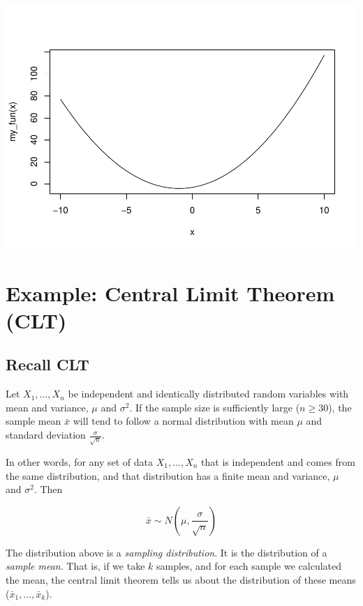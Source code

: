 \documentclass[
]{book}
\begin{document}
\includegraphics{_main_files/figure-latex/unnamed-chunk-289-1.pdf}

\hypertarget{example-central-limit-theorem-clt}{%
\section{Example: Central Limit Theorem (CLT)}\label{example-central-limit-theorem-clt}}

\hypertarget{recall-clt}{%
\subsection{Recall CLT}\label{recall-clt}}

Let \(X_1, ..., X_n\) be independent and identically distributed random variables with mean and variance, \(\mu\) and \(\sigma^2\). If the sample size is sufficiently large (\(n \geq 30\)), the sample mean \(\bar{x}\) will tend to follow a normal distribution with mean \(\mu\) and standard deviation \(\frac{\sigma}{\sqrt{n}}\).

In other words, for any set of data \(X_1, ..., X_n\) that is independent and comes from the same distribution, and that distribution has a finite mean and variance, \(\mu\) and \(\sigma^2\). Then

\[\bar{x} \sim N \left ( \mu, \frac{\sigma}{\sqrt{n}} \right ) \]

The distribution above is a \emph{sampling distribution}. It is the distribution of a \emph{sample mean}. That is, if we take \(k\) samples, and for each sample we calculated the mean, the central limit theorem tells us about the distribution of these means (\(\bar{x}_1, \dots, \bar{x}_k\)).
\end{document}
